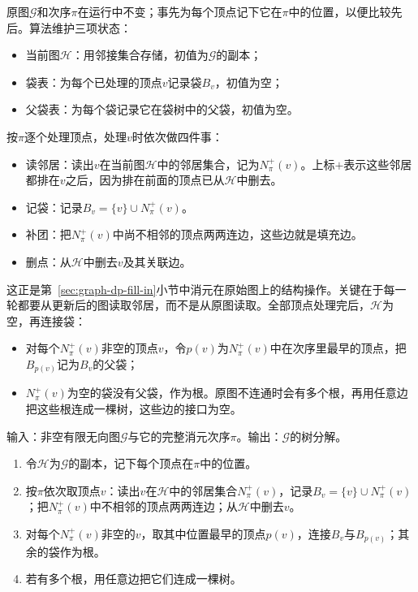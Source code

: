 原图$\mathcal G$和次序$\pi$在运行中不变；事先为每个顶点记下它在$\pi$中的位置，以便比较先后。算法维护三项状态：
\begin{itemize}
  \item 当前图$\mathcal H$：用邻接集合存储，初值为$\mathcal G$的副本；
  \item 袋表：为每个已处理的顶点$v$记录袋$B_v$，初值为空；
  \item 父袋表：为每个袋记录它在袋树中的父袋，初值为空。
\end{itemize}
按$\pi$逐个处理顶点，处理$v$时依次做四件事：
\begin{itemize}
  \item 读邻居：读出$v$在当前图$\mathcal H$中的邻居集合，记为$N^+_\pi(v)$。上标$+$表示这些邻居都排在$v$之后，因为排在前面的顶点已从$\mathcal H$中删去。
  \item 记袋：记录$B_v=\{v\}\cup N^+_\pi(v)$。
  \item 补团：把$N^+_\pi(v)$中尚不相邻的顶点两两连边，这些边就是填充边。
  \item 删点：从$\mathcal H$中删去$v$及其关联边。
\end{itemize}
这正是第~\ref{sec:graph-dp-fill-in}小节中消元在原始图上的结构操作。关键在于每一轮都要从更新后的图读取邻居，而不是从原图读取。全部顶点处理完后，$\mathcal H$为空，再连接袋：
\begin{itemize}
  \item 对每个$N^+_\pi(v)$非空的顶点$v$，令$p(v)$为$N^+_\pi(v)$中在次序里最早的顶点，把$B_{p(v)}$记为$B_v$的父袋；
  \item $N^+_\pi(v)$为空的袋没有父袋，作为根。原图不连通时会有多个根，再用任意边把这些根连成一棵树，这些边的接口为空。
\end{itemize}

\begin{algorithm}[由消元次序构造树分解]
\label{alg:graph-dp-order-to-decomposition}
输入：非空有限无向图$\mathcal G$与它的完整消元次序$\pi$。输出：$\mathcal G$的树分解。
\begin{enumerate}
  \item 令$\mathcal H$为$\mathcal G$的副本，记下每个顶点在$\pi$中的位置。
  \item 按$\pi$依次取顶点$v$：读出$v$在$\mathcal H$中的邻居集合$N^+_\pi(v)$，记录$B_v=\{v\}\cup N^+_\pi(v)$；把$N^+_\pi(v)$中不相邻的顶点两两连边；从$\mathcal H$中删去$v$。
  \item 对每个$N^+_\pi(v)$非空的$v$，取其中位置最早的顶点$p(v)$，连接$B_v$与$B_{p(v)}$；其余的袋作为根。
  \item 若有多个根，用任意边把它们连成一棵树。
\end{enumerate}
\end{algorithm}

